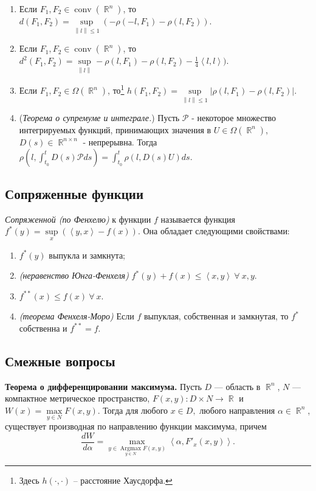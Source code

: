 \documentclass[a4paper,12pt]{scrartcl}
\DeclareMathOperator{\bbr}{\mathbb{R}}
\newcommand{\conv}{\mathop{\mathrm{conv}}}
\newcommand{\Argmax}{\mathop{\mathrm{Argmax}}}
\newcommand{\scalar}[2]{\left<#1,#2\right>}
\newcommand{\norm}[1]{\left\lVert #1 \right\rVert}
\begin{document}
\begin{enumerate}
 \item Если $F_1,F_2\in\conv(\bbr^n)$, то $d(F_1,F_2) = \sup\limits_{\norm{l} \leqslant 1}(-\rho(-l,F_1)-\rho(l,F_2))$.
 \item Если $F_1,F_2\in\conv(\bbr^n)$, то $d^2(F_1,F_2) = \sup\limits_{\norm{l}} -\rho(l,F_1) - \rho(l,F_2) - \frac{1}{4}\scalar{l}{l})$.
 \item Если $F_1,F_2\in\Omega(\bbr^n)$, то\footnote{Здесь $h(\cdot,\cdot)$ -- расстояние Хаусдорфа.} $h(F_1,F_2) = \sup\limits_{\norm{l} \leqslant 1}|\rho(l,F_1) - \rho(l,F_2)|$.
 \item (\textit{Теорема о супремуме и интеграле.}) Пусть $\mathcal{P}$ - некоторое множество интегрируемых функций, принимающих значения в $U\in\Omega(\bbr^n)$, $D(s)\in\bbr^{n\times n}$ - непрерывна. Тогда $\rho\left(l, \int_{t_0}^{t}D(s)\mathcal{P}ds\right) = \int_{t_0}^{t}\rho(l,D(s)U)ds.$
\end{enumerate}
\subsection{Сопряженные функции}
\textit{Сопряженной (по Фенхелю)} к функции $f$ называется функция $f^*(y) = \sup\limits_{x}(\scalar{y}{x} - f(x))$. Она обладает следующими свойствами:
\begin{enumerate}
 \item  $f^*(y)$ выпукла и замкнута;
 \item \textit{(неравенство Юнга-Фенхеля)} $f^*(y) + f(x) \leqslant \scalar{x}{y}\ \forall\ x,y$.
 \item $f^{**}(x) \leqslant f(x)\ \forall\ x$.
 \item \textit{(теорема Фенхеля-Моро)} Если $f$ выпуклая, собственная и замкнутая, то $f^*$ собственна и $f^{**} = f$.
\end{enumerate}
\subsection{Смежные вопросы}
\textbf{Теорема о дифференцировании максимума.} Пусть $D$ --- область в $\bbr ^n$, $N$ --- компактное метрическое пространство, $F(x,y): D\times N \to\bbr$ и $W(x) = \max\limits_{y\in N}F(x,y)$. Тогда для любого $x\in D,$ любого направления $\alpha \in \bbr^n$, существует производная по направлению функции максимума, причем
$$
\dfrac{dW}{d\alpha} = \max\limits_{y\in \Argmax \limits_{y\in N}F(x,y)} \scalar{\alpha}{F'_x(x,y)}.
$$
\end{document}
